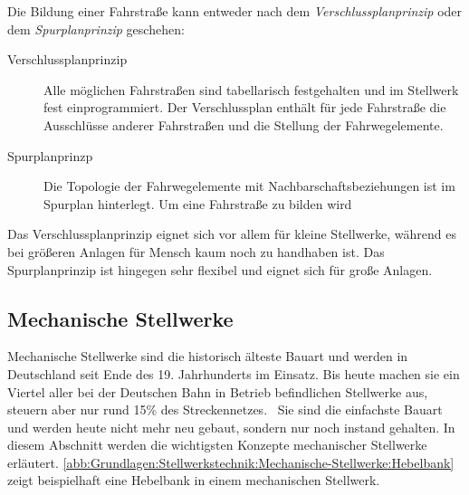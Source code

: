 Die Bildung einer Fahrstraße kann entweder nach dem \textit{Verschlussplanprinzip} oder dem \textit{Spurplanprinzip} geschehen:

\begin{description}
    \item[Verschlussplanprinzip] Alle möglichen Fahrstraßen sind tabellarisch festgehalten und im Stellwerk fest einprogrammiert. Der Verschlussplan enthält für jede Fahrstraße die Ausschlüsse anderer Fahrstraßen und die Stellung der Fahrwegelemente.~\cite*[][S. 122 f.]{bib:Sicherung-des-Schienenverkehrs}
    \item[Spurplanprinzp] Die Topologie der Fahrwegelemente mit Nachbarschaftsbeziehungen ist im Spurplan hinterlegt. Um eine Fahrstraße zu bilden wird ~\cite*[][S. 123]{bib:Sicherung-des-Schienenverkehrs}
\end{description}

Das Verschlussplanprinzip eignet sich vor allem für kleine Stellwerke, während es bei größeren Anlagen für Mensch kaum noch zu handhaben ist. Das Spurplanprinzip ist hingegen sehr flexibel und eignet sich für große Anlagen.~\cite*[][S. 124 f.]{bib:Sicherung-des-Schienenverkehrs}

\subsection{Mechanische Stellwerke}\label{text:Grundlagen:Stellwerkstechnik:Mechanische-Stellwerke}

Mechanische Stellwerke sind die historisch älteste Bauart und werden in Deutschland seit Ende des 19. Jahrhunderts im Einsatz. Bis heute machen sie ein Viertel aller bei der Deutschen Bahn in Betrieb befindlichen Stellwerke aus, steuern aber nur rund 15\% des Streckennetzes.~\cite{bib:DB:Stellwerke} Sie sind die einfachste Bauart und werden heute nicht mehr neu gebaut, sondern nur noch instand gehalten. In diesem Abschnitt werden die wichtigsten Konzepte mechanischer Stellwerke erläutert. \autoref{abb:Grundlagen:Stellwerkstechnik:Mechanische-Stellwerke:Hebelbank} zeigt beispielhaft eine Hebelbank in einem mechanischen Stellwerk.

